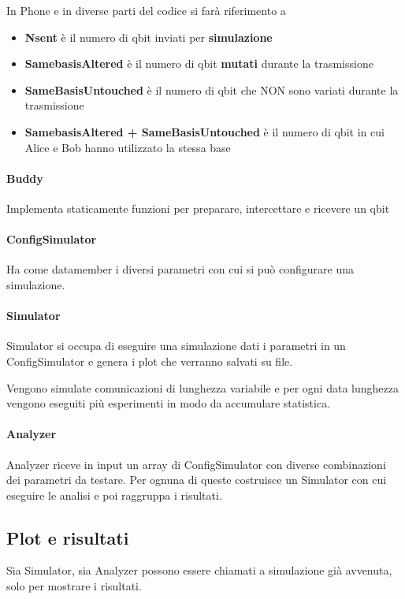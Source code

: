 \documentclass[11 pt, a4paper]{article}
\begin{document}
In Phone e in diverse parti del codice si farà riferimento a
\begin{itemize}
\item \textbf{Nsent} è il numero di qbit inviati per \textbf{simulazione}
\item \textbf{SamebasisAltered} è il numero di qbit \textbf{mutati} durante la trasmissione
\item \textbf{SameBasisUntouched} è il numero di qbit che NON sono variati durante la trasmissione
\item \textbf{SamebasisAltered + SameBasisUntouched} è il numero di qbit in cui Alice e Bob hanno utilizzato la stessa base
\end{itemize}

\paragraph{Buddy}
Implementa staticamente funzioni per preparare, intercettare e ricevere un qbit

\paragraph{ConfigSimulator}
Ha come datamember i diversi parametri con cui si può configurare una simulazione.

\paragraph{Simulator}
Simulator si occupa di eseguire una simulazione dati i parametri in un ConfigSimulator e genera i plot che verranno salvati su file.

Vengono simulate comunicazioni di lunghezza variabile e per ogni data lunghezza vengono eseguiti più esperimenti in modo da accumulare statistica.

\paragraph{Analyzer}
Analyzer riceve in input un array di ConfigSimulator con diverse combinazioni dei parametri da testare. Per ognuna di queste costruisce un Simulator con cui eseguire le analisi e poi raggruppa i risultati.

\subsection{Plot e risultati}
Sia Simulator, sia Analyzer possono essere chiamati a simulazione già avvenuta, solo per mostrare i risultati.
\end{document}
